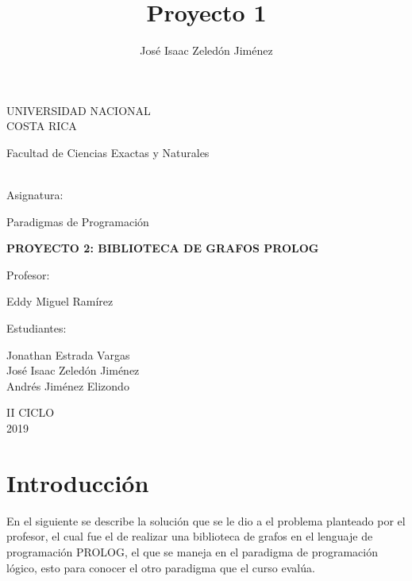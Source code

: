 \documentclass[10pt,a4paper]{article}
\author{José Isaac Zeledón Jiménez}
\title{Proyecto 1}
\begin{document}
\begin{titlepage}
\begin{center}
\begin{large}
UNIVERSIDAD NACIONAL\\
COSTA RICA \\
\end{large}
\vspace*{1cm}
\begin{large}
Facultad de Ciencias Exactas y Naturales
\end{large} 
\vspace*{1.8cm}\\
Asignatura:\\
\vspace*{2mm}
\begin{large}
Paradigmas de Programación\\
\end{large}
\vspace*{12mm}
\begin{large}
\textbf{PROYECTO 2: 
BIBLIOTECA DE GRAFOS PROLOG
}\\
\end{large}
\vspace*{1.8cm}
Profesor:\\
\vspace*{5mm}
\begin{large}
Eddy Miguel Ramírez\\
\end{large}
\vspace*{1.8cm}
Estudiantes: \\
\vspace*{5mm}
\begin{large}
Jonathan Estrada Vargas\\
José Isaac Zeledón Jiménez\\
Andrés Jiménez Elizondo\\
\end{large}
\vspace*{1.8cm}
II CICLO\\
\vspace*{1.8cm}
2019
\end{center}
\end{titlepage}
\tableofcontents
\pagebreak
\section{Introducción}
\bigskip
\bigskip
	En el siguiente se describe la solución que se le dio a el problema planteado por el profesor, el cual fue el de realizar una biblioteca de grafos en el lenguaje de programación PROLOG, el  que se maneja en el paradigma de programación lógico, esto para conocer el otro paradigma que el curso evalúa.\\
\end{document}
